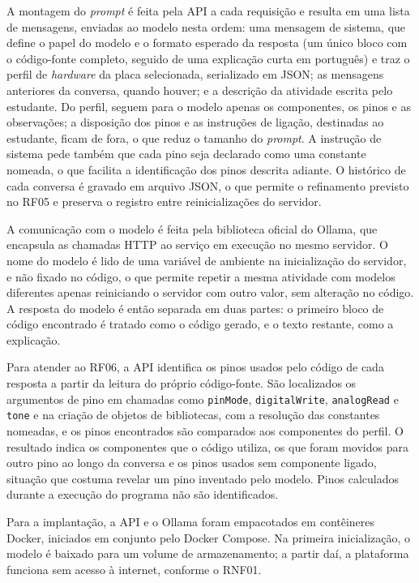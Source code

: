 A montagem do \textit{prompt} é feita pela API a cada requisição e resulta em uma lista de mensagens, enviadas ao modelo nesta ordem: uma mensagem de sistema, que define o papel do modelo e o formato esperado da resposta (um único bloco com o código-fonte completo, seguido de uma explicação curta em português) e traz o perfil de \textit{hardware} da placa selecionada, serializado em JSON; as mensagens anteriores da conversa, quando houver; e a descrição da atividade escrita pelo estudante. Do perfil, seguem para o modelo apenas os componentes, os pinos e as observações; a disposição dos pinos e as instruções de ligação, destinadas ao estudante, ficam de fora, o que reduz o tamanho do \textit{prompt}. A instrução de sistema pede também que cada pino seja declarado como uma constante nomeada, o que facilita a identificação dos pinos descrita adiante. O histórico de cada conversa é gravado em arquivo JSON, o que permite o refinamento previsto no RF05 e preserva o registro entre reinicializações do servidor.

A comunicação com o modelo é feita pela biblioteca oficial do Ollama, que encapsula as chamadas HTTP ao serviço em execução no mesmo servidor. O nome do modelo é lido de uma variável de ambiente na inicialização do servidor, e não fixado no código, o que permite repetir a mesma atividade com modelos diferentes apenas reiniciando o servidor com outro valor, sem alteração no código. A resposta do modelo é então separada em duas partes: o primeiro bloco de código encontrado é tratado como o código gerado, e o texto restante, como a explicação.

Para atender ao RF06, a API identifica os pinos usados pelo código de cada resposta a partir da leitura do próprio código-fonte. São localizados os argumentos de pino em chamadas como \texttt{pinMode}, \texttt{digitalWrite}, \texttt{analogRead} e \texttt{tone} e na criação de objetos de bibliotecas, com a resolução das constantes nomeadas, e os pinos encontrados são comparados aos componentes do perfil. O resultado indica os componentes que o código utiliza, os que foram movidos para outro pino ao longo da conversa e os pinos usados sem componente ligado, situação que costuma revelar um pino inventado pelo modelo. Pinos calculados durante a execução do programa não são identificados.

Para a implantação, a API e o Ollama foram empacotados em contêineres Docker, iniciados em conjunto pelo Docker Compose. Na primeira inicialização, o modelo é baixado para um volume de armazenamento; a partir daí, a plataforma funciona sem acesso à internet, conforme o RNF01.

